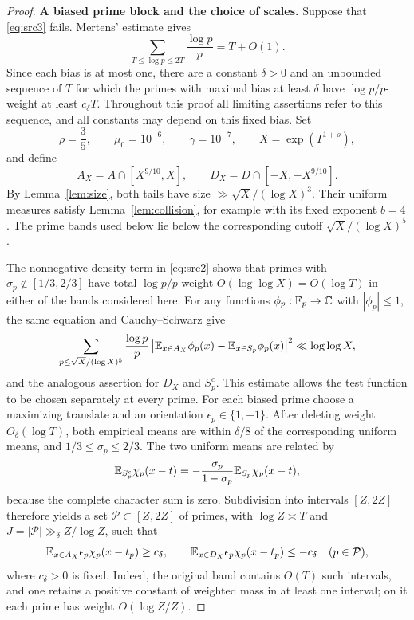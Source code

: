 \begin{proof}
\textbf{A biased prime block and the choice of scales.}
Suppose that \eqref{eq:src3} fails.  Mertens' estimate gives
\[
 \sum_{T\leq\log p\leq2T}\frac{\log p}{p}=T+O(1).
\]
Since each bias is at most one, there are a constant $\delta>0$ and an unbounded sequence of
$T$ for which the primes with maximal bias at least $\delta$ have
$\log p/p$-weight at least $c_\delta T$.
Throughout this proof all limiting assertions refer to this sequence,
and all constants may depend on this fixed bias.  Set
\[
 \rho=\frac35,\qquad \mu_0=10^{-6},\qquad \gamma=10^{-7},\qquad
 X=\exp(T^{1+\rho}),
\]
and define
\[
 A_X=A\cap[X^{9/10},X],\qquad
 D_X=D\cap[-X,-X^{9/10}].
\]
By Lemma~\ref{lem:size}, both tails have size
$\gg \sqrt X/(\log X)^3$.  Their uniform measures satisfy
Lemma~\ref{lem:collision}, for example with its fixed exponent $b=4$.
The prime bands used below lie below the corresponding cutoff
$\sqrt X/(\log X)^5$.

The nonnegative density term in \eqref{eq:src2} shows that primes with
$\sigma_p\notin[1/3,2/3]$ have total $\log p/p$-weight
$O(\log\log X)=O(\log T)$ in either of the bands considered here.
For any functions $\phi_p:\mathbb F_p\to\mathbb C$ with $|\phi_p|\leq1$, the same equation and
Cauchy--Schwarz give
\[
 \sum_{p\leq \sqrt X/(\log X)^5}\frac{\log p}{p}
 \left|\mathbb E_{x\in A_X}\phi_p(x)
       -\mathbb E_{x\in S_p}\phi_p(x)\right|^2
 \ll\log\log X,
\]
and the analogous assertion for $D_X$ and $S_p^c$.  This estimate
allows the test function to be chosen separately at every prime.
For each biased prime choose a maximizing translate and an orientation
$\epsilon_p\in\{1,-1\}$.  After deleting weight $O_\delta(\log T)$,
both empirical means are within $\delta/8$ of the corresponding
uniform means, and $1/3\leq\sigma_p\leq2/3$.
The two uniform means are related by
\[
 \mathbb E_{S_p^c}\chi_p(x-t)
   =-\frac{\sigma_p}{1-\sigma_p}\mathbb E_{S_p}\chi_p(x-t),
\]
because the complete character sum is zero.
Subdivision into intervals $[Z,2Z]$ therefore yields a set
$\mathcal P\subset[Z,2Z]$ of primes, with
$\log Z\asymp T$ and $J=|\mathcal P|\gg_\delta Z/\log Z$, such that
\begin{equation}\label{eq:src4}
 \mathbb E_{x\in A_X}\epsilon_p\chi_p(x-t_p)\geq c_\delta,
 \qquad
 \mathbb E_{x\in D_X}\epsilon_p\chi_p(x-t_p)\leq-c_\delta
 \quad(p\in\mathcal P),
\end{equation}
where $c_\delta>0$ is fixed.  Indeed, the original band contains
$O(T)$ such intervals, and one retains a positive constant of weighted
mass in at least one interval; on it each prime has weight
$O(\log Z/Z)$.


\end{proof}
